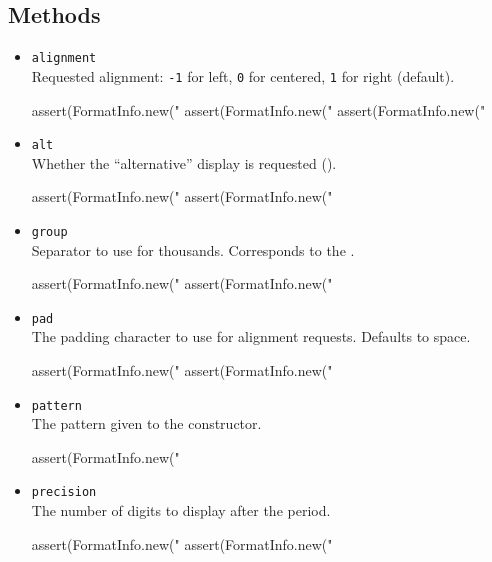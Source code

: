 \subsection{Methods}
\begin{itemize}
\item \lstinline|alignment|\\
  Requested alignment: \lstinline|-1| for left, \lstinline|0| for
  centered, \lstinline|1| for right (default).
\begin{urbiscript}[firstnumber=last]
assert(FormatInfo.new("%
assert(FormatInfo.new("%
assert(FormatInfo.new("%
\end{urbiscript}

\item \lstinline|alt|\\
  Whether the ``alternative'' display is requested (\samp{\#}).
\begin{urbiscript}[firstnumber=last]
assert(FormatInfo.new("%
assert(FormatInfo.new("%
\end{urbiscript}

\item \lstinline|group|\\
  Separator to use for thousands.  Corresponds to the 
  .
\begin{urbiscript}[firstnumber=last]
assert(FormatInfo.new("%
assert(FormatInfo.new("%
\end{urbiscript}

\item \lstinline|pad|\\
  The padding character to use for alignment requests.  Defaults to space.
\begin{urbiscript}[firstnumber=last]
assert(FormatInfo.new("%
assert(FormatInfo.new("%
\end{urbiscript}

\item \lstinline|pattern|\\
  The pattern given to the constructor.
\begin{urbiscript}[firstnumber=last]
assert(FormatInfo.new("%
\end{urbiscript}

\item \lstinline|precision|\\
  The number of digits to display after the period.
\begin{urbiscript}[firstnumber=last]
assert(FormatInfo.new("%
assert(FormatInfo.new("%
\end{urbiscript}


\end{itemize}
